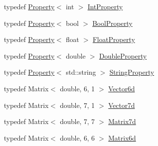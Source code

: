 \begin{DoxyCompactItemize}
typedef \hyperlink{classg2o_1_1Property}{Property}$<$ int $>$ \hyperlink{namespaceg2o_aa44e64803eabdb592175e27f1e3ebf59}{Int\+Property}
\item 
typedef \hyperlink{classg2o_1_1Property}{Property}$<$ bool $>$ \hyperlink{namespaceg2o_a28e624fedcafeb2b049be2930421071f}{Bool\+Property}
\item 
typedef \hyperlink{classg2o_1_1Property}{Property}$<$ float $>$ \hyperlink{namespaceg2o_af8e55b06b00e915fcf0475b00acea270}{Float\+Property}
\item 
typedef \hyperlink{classg2o_1_1Property}{Property}$<$ double $>$ \hyperlink{namespaceg2o_a9b4e25cbdaf9d69afa4431d6af6d7bed}{Double\+Property}
\item 
typedef \hyperlink{classg2o_1_1Property}{Property}$<$ std\+::string $>$ \hyperlink{namespaceg2o_a40c5b0f5bf1dd1e5b9c25c20fcf43920}{String\+Property}
\item 
typedef Matrix$<$ double, 6, 1 $>$ \hyperlink{namespaceg2o_a3bc8a4fbac86f158d548be81af2f929b}{Vector6d}
\item 
typedef Matrix$<$ double, 7, 1 $>$ \hyperlink{namespaceg2o_a4740ec41130f2ecc628c81f71261c8de}{Vector7d}
\item 
typedef Matrix$<$ double, 7, 7 $>$ \hyperlink{namespaceg2o_a3ce3dfdcb313ec3483b8cee099402e54}{Matrix7d}
\item 
typedef Matrix$<$ double, 6, 6 $>$ \hyperlink{namespaceg2o_afff8bcc18e5be58eef0961900ddda24b}{Matrix6d}
\end{DoxyCompactItemize}
